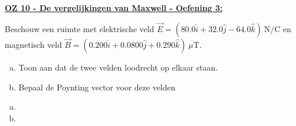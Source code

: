 \textbf{\underline{OZ 10 - De vergelijkingen van Maxwell - Oefening 3:}}
\vspace{0.5cm}

Beschouw een ruimte met elektrische veld $\vec{E} = (80.0\hat{i} + 32.0\hat{j} - 64.0\hat{k}) \ \text{N/C}$ en magnetisch veld $\vec{B} = (0.200\hat{i} + 0.0800\hat{j} + 0.290\hat{k}) \ \mu\text{T}$.

\begin{enumerate}[(a)]
    \item Toon aan dat de twee velden loodrecht op elkaar staan.
    \item Bepaal de Poynting vector voor deze velden
\end{enumerate}

\begin{enumerate}[(a)]
    \item 
        \begin{description}[labelwidth=1.5cm, leftmargin=!]
            \item[Geg. :]   
            \item[Gevr. :] 
            \item[Opl. :]   
        \end{description}
    \item
        \begin{description}[labelwidth=1.5cm, leftmargin=!]
            \item[Geg. :]   
            \item[Gevr. :] 
            \item[Opl. :]   
        \end{description}
\end{enumerate}

\vspace{1cm}